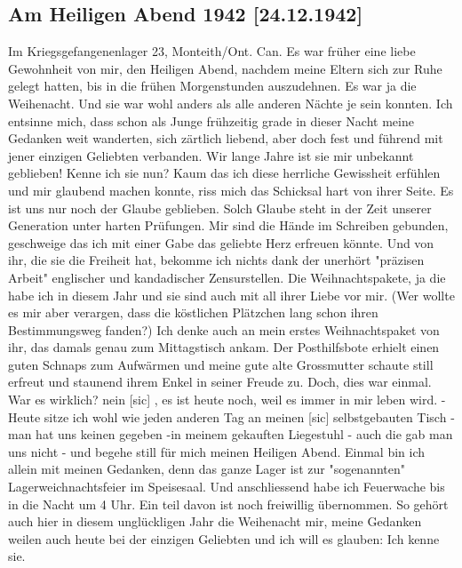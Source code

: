 \subsection{Am Heiligen Abend 1942 {\color{red} [24.12.1942] }}

Im Kriegsgefangenenlager 23, Monteith/Ont. Can.
Es war fr\"{u}her eine liebe Gewohnheit von mir, den Heiligen Abend, nachdem meine Eltern sich zur Ruhe gelegt hatten, bis in die fr\"{u}hen Morgenstunden auszudehnen.
Es war ja die Weihenacht.
Und sie war wohl anders als alle anderen N\"{a}chte je sein konnten.
Ich entsinne mich, dass schon als Junge fr\"{u}hzeitig grade in dieser Nacht meine Gedanken weit wanderten, sich z\"{a}rtlich liebend, aber doch fest und f\"{u}hrend mit jener einzigen Geliebten verbanden.
Wir lange Jahre ist sie mir unbekannt geblieben!
Kenne ich sie nun?
Kaum das ich diese herrliche Gewissheit erf\"{u}hlen und mir glaubend machen konnte, riss mich das Schicksal hart von ihrer Seite.
Es ist uns nur noch der Glaube geblieben.
Solch Glaube steht in der Zeit unserer Generation unter harten Pr\"{u}fungen.
Mir sind die H\"{a}nde im Schreiben gebunden, geschweige das ich mit einer Gabe das geliebte Herz erfreuen k\"{o}nnte.
Und von ihr, die sie die Freiheit hat, bekomme ich nichts dank der unerh\"{o}rt "pr\"{a}zisen Arbeit" englischer und kandadischer Zensurstellen.
Die Weihnachtspakete, ja die habe ich in diesem Jahr und sie sind auch mit all ihrer Liebe vor mir.
(Wer wollte es mir aber verargen, dass die k\"{o}stlichen Pl\"{a}tzchen lang schon ihren Bestimmungsweg fanden?)
Ich denke auch an mein erstes Weihnachtspaket von ihr, das damals genau zum Mittagstisch ankam.
Der Posthilfsbote erhielt einen guten Schnaps zum Aufw\"{a}rmen und meine gute alte Grossmutter schaute still erfreut und staunend ihrem Enkel in seiner Freude zu.
Doch, dies war einmal.
War es wirklich?
nein{\color{red} [sic] }, es ist heute noch, weil es immer in mir leben wird.
- Heute sitze ich wohl wie jeden anderen Tag an meinen{\color{red} [sic] } selbstgebauten Tisch - man hat uns keinen gegeben -in meinem gekauften Liegestuhl - auch die gab man uns nicht - und begehe still f\"{u}r mich meinen Heiligen Abend.
Einmal bin ich allein mit meinen Gedanken, denn das ganze Lager ist zur "sogenannten" Lagerweichnachtsfeier im Speisesaal.
Und anschliessend habe ich Feuerwache bis in die Nacht um 4 Uhr.
Ein teil davon ist noch freiwillig \"{u}bernommen.
So geh\"{o}rt auch hier in diesem ungl\"{u}ckligen Jahr die Weihenacht mir, meine Gedanken weilen auch heute bei der einzigen Geliebten und ich will es glauben: Ich kenne sie.

\clearpage
